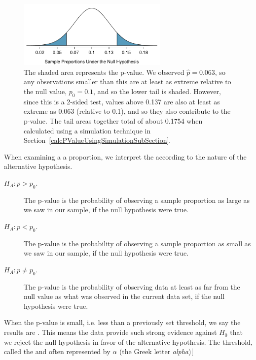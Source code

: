 \begin{figure}[ht]
\centering
\includegraphics[width=0.65\textwidth]{ch_inference_foundations/figures/MedicalConsultant/MedConsNullNormal}
\caption{The shaded area represents the p-value. We observed $\hat{p} = 0.063$, so any observations smaller than this are at least as extreme relative to the null value, $p_0 = 0.1$, and so the lower tail is shaded. However, since this is a 2-sided test, values above 0.137 are also at least as extreme as 0.063 (relative to 0.1), and so they also contribute to the p-value. The tail areas together total of about 0.1754 when calculated using a simulation technique in Section~\ref{calcPValueUsingSimulationSubSection}.}
\label{MedConsNullNormal}
\end{figure}

\begin{termBox}{
When examining a a proportion, we interpret the  according to the nature of the alternative hypothesis.
\begin{description}
\item[$H_A: p > p_0.$ ] The p-value is the probability of observing a sample proportion as large as we saw in our sample, if the null hypothesis were true.
\item[$H_A: p < p_0.$ ]The p-value is the probability of observing a sample proportion as small as we saw in our sample, if the null hypothesis were true.
\item[$H_A: p \ne p_0.$] The p-value is the probability of observing data at least as far from the null value as what was observed in the current data set, if the null hypothesis were true.
\end{description}}
\end{termBox}

When the p-value is small, i.e. less than a previously set threshold, we say the results are . This means the data provide such strong evidence against $H_0$ that we reject the null hypothesis in favor of the alternative hypothesis. The threshold, called the  and often represented by $\alpha$ (the Greek letter \emph{alpha}\label{alphadiscussion})\marginpar[\raggedright\vspace{-4mm}

